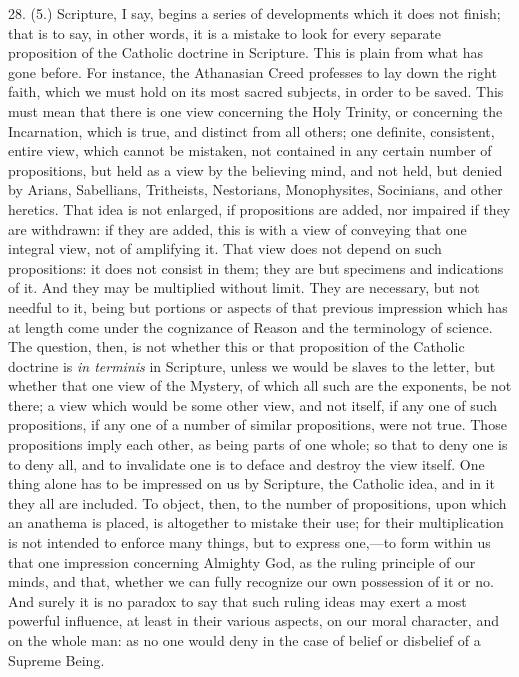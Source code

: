 28. (5.) Scripture, I say, begins a series of developments which it
does not finish; that is to say, in other words, it is a mistake to
look for every separate proposition of the Catholic doctrine in
Scripture. This is plain from what has gone before. For instance, the
Athanasian Creed professes to lay down the right faith, which we must
hold on its most sacred subjects, in order to be saved. This must mean
that there is one view concerning the Holy Trinity, or concerning the
Incarnation, which is true, and distinct from all others; one
definite, consistent, entire view, which cannot be mistaken, not
contained in any certain number of propositions, but held as a view by
the believing mind, and not held, but denied by Arians, Sabellians,
Tritheists, Nestorians, Monophysites, Socinians, and other heretics.
That idea is not enlarged, if propositions are added, nor impaired if
they are withdrawn: if they are added, this is with a view of
conveying that one integral view, not of amplifying it. That view does
not depend on such propositions: it does not consist in them; they are
but specimens and indications of it. And they may be multiplied
without limit. They are necessary, but not needful to it, being but
portions or aspects of that previous impression which has at length
come under the cognizance of Reason and the terminology of science.
The question, then, is not whether this or that proposition of the
Catholic doctrine is \emph{in terminis} in Scripture, unless we would
be slaves to the letter, but whether that one view of the Mystery, of
which all such are the exponents, be not there; a view which would be
some other view, and not itself, if any one of such propositions, if
any one of a number of similar propositions, were not true. Those
propositions imply each other, as being parts of one whole; so that to
deny one is to deny all, and to invalidate one is to deface and
destroy the view itself. One thing alone has to be impressed on us by
Scripture, the Catholic idea, and in it they all are included. To
object, then, to the number of propositions, upon which an anathema is
placed, is altogether to mistake their use; for their multiplication
is not intended to enforce many things, but to express one,—to form
within us that one impression concerning Almighty God, as the ruling
principle of our minds, and that, whether we can fully recognize our
own possession of it or no. And surely it is no paradox to say that
such ruling ideas may exert a most powerful influence, at least in
their various aspects, on our moral character, and on the whole man:
as no one would deny in the case of belief or disbelief of a Supreme
Being.

